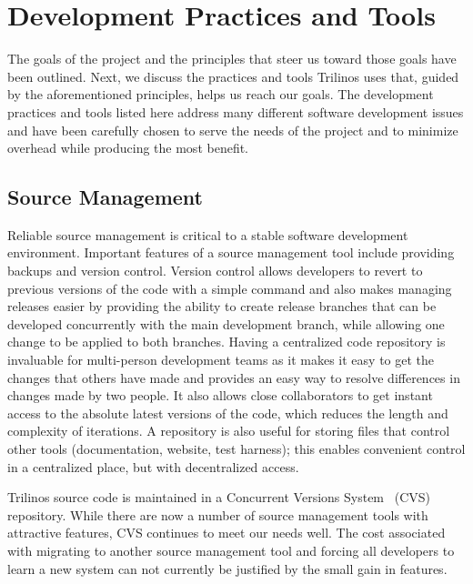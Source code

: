 \documentclass{doublecol}
\begin{document}

\section{Development Practices and Tools}
\label{Section:DevelopmentPracticesTools}

The goals of the project and the principles that steer us toward
those goals have been outlined.  Next, we discuss the practices and
tools Trilinos uses that, guided by the aforementioned principles,
helps us reach our goals. The development practices and tools listed
here address many different software development issues and have
been carefully chosen to serve the needs of the project and to
minimize overhead while producing the most benefit.


\subsection{Source Management}


Reliable source management is critical to a stable software
development environment.  Important features of a source management
tool include providing backups and version control.  Version control
allows developers to revert to previous versions of the code with a
simple command and also makes managing releases easier by providing
the ability to create release branches that can be developed
concurrently with the main development branch, while allowing one
change to be applied to both branches.  Having a centralized code
repository is invaluable for multi-person development teams as it
makes it easy to get the changes that others have made and provides
an easy way to resolve differences in changes made by two people. It
also allows close collaborators to get instant access to the
absolute latest versions of the code, which reduces the length and
complexity of iterations.  A repository is also useful for storing
files that control other tools (documentation, website, test
harness); this enables convenient control in a centralized place,
but with decentralized access.

Trilinos source code is maintained in a Concurrent Versions
System~\cite{CVS} (CVS) repository.  While there are now a number of
source management tools with attractive features, CVS continues to
meet our needs well.  The cost associated with migrating to another
source management tool and forcing all developers to learn a new
system can not currently be justified by the small gain in features.
\end{document}

